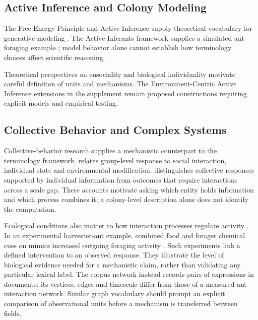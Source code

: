 \documentclass[
]{article}
\numberwithin{equation}{section}
\begin{document}
\subsection{Active Inference and Colony
Modeling}\label{active-inference-and-colony-modeling}

The Free Energy Principle and Active Inference supply theoretical
vocabulary for generative modeling
\citep{friston2010free, friston2013life, clark2013whatever, kirchhoff2018markov}.
The Active Inferants framework supplies a simulated ant-foraging example
\citep{friedman2021active}; model behavior alone cannot establish how
terminology choices affect scientific reasoning.

Theoretical perspectives on eusociality and biological individuality
\citep{nowak2010evolution, boomsma2018superorganismality} motivate
careful definition of units and mechanisms. The Environment-Centric
Active Inference extensions in the supplement remain proposed
constructions requiring explicit models and empirical testing.

\subsection{Collective Behavior and Complex
Systems}\label{collective-behavior-and-complex-systems}

Collective-behavior research supplies a mechanistic counterpart to the
terminology framework. \citet{couzin2009collective} relates group-level
response to social interaction, individual state and environmental
modification. \citet{feinerman2017cognition} distinguishes collective
responses supported by individual information from outcomes that require
interactions across a scale gap. These accounts motivate asking which
entity holds information and which process combines it; a colony-level
description alone does not identify the computation.

Ecological conditions also matter to how interaction processes regulate
activity \citep{gordon2014ecology}. In an experimental harvester-ant
example, combined food and forager chemical cues on mimics increased
outgoing foraging activity \citep{greene2013chemical}. Such experiments
link a defined intervention to an observed response. They illustrate the
level of biological evidence needed for a mechanistic claim, rather than
validating any particular lexical label. The corpus network instead
records pairs of expressions in documents: its vertices, edges and
timescale differ from those of a measured ant-interaction network.
Similar graph vocabulary should prompt an explicit comparison of
observational units before a mechanism is transferred between fields.
\end{document}
